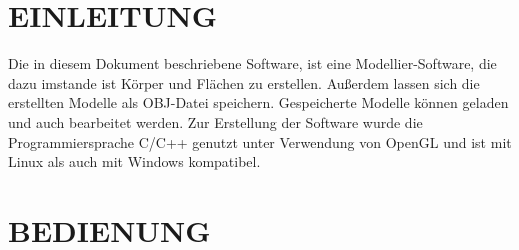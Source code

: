 \newpage
\section{\Large EINLEITUNG}
Die in diesem Dokument beschriebene Software, ist eine Modellier-Software, die dazu imstande ist Körper und Flächen zu erstellen. Außerdem lassen sich die erstellten Modelle als OBJ-Datei speichern. Gespeicherte Modelle können geladen und auch bearbeitet werden.\newline
Zur Erstellung der Software wurde die Programmiersprache C/C++ genutzt unter Verwendung von OpenGL und ist mit Linux als auch mit Windows kompatibel.

\section{\Large BEDIENUNG}
